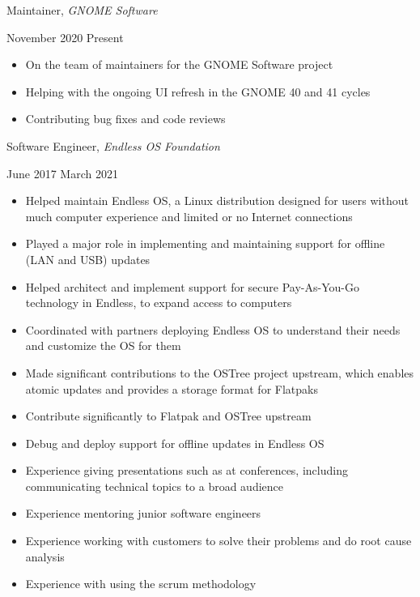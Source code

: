 \documentclass[11pt]{article}
\begin{document}
\begin{minipage}[t]{0.65\textwidth}
\flushleft
Maintainer, \textit{GNOME Software}\\
\end{minipage}
\begin{minipage}[t]{0.30\textwidth}
\flushright
November 2020 \space \textemdash \space Present\\
\end{minipage}

\begin{itemize}
  \item On the team of maintainers for the GNOME Software project
  \item Helping with the ongoing UI refresh in the GNOME 40 and 41 cycles
  \item Contributing bug fixes and code reviews
\end{itemize}

\begin{minipage}[t]{0.65\textwidth}
\flushleft
Software Engineer, \textit{Endless OS Foundation}\\
\end{minipage}
\begin{minipage}[t]{0.30\textwidth}
\flushright
June 2017 \space \textemdash \space March 2021\\
\end{minipage}

\begin{itemize}
  \item Helped maintain Endless OS, a Linux distribution designed for users without much computer experience and limited or no Internet connections
  \item Played a major role in implementing and maintaining support for offline (LAN and USB) updates
  \item Helped architect and implement support for secure Pay-As-You-Go technology in Endless, to expand access to computers
  \item Coordinated with partners deploying Endless OS to understand their needs and customize the OS for them
  \item Made significant contributions to the OSTree project upstream, which enables atomic updates and provides a storage format for Flatpaks
  \item Contribute significantly to Flatpak and OSTree upstream
  \item Debug and deploy support for offline updates in Endless OS
  \item Experience giving presentations such as at conferences, including communicating technical topics to a broad audience
  \item Experience mentoring junior software engineers
  \item Experience working with customers to solve their problems and do root cause analysis
  \item Experience with using the scrum methodology
\end{itemize}
\end{document}
